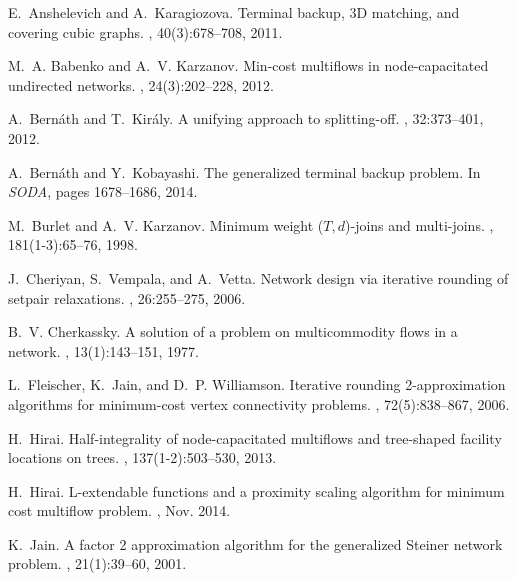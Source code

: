 \documentclass{article}
\begin{document}
\begin{thebibliography}{10}

E.~Anshelevich and A.~Karagiozova.
\newblock Terminal backup, {3D} matching, and covering cubic graphs.
, 40(3):678--708, 2011.

M.~A. Babenko and A.~V. Karzanov.
\newblock Min-cost multiflows in node-capacitated undirected networks.
, 24(3):202--228, 2012.

A.~Bern{\'a}th and T.~Kir{\'a}ly.
\newblock A unifying approach to splitting-off.
, 32:373--401, 2012.

A.~Bern{\'a}th and Y.~Kobayashi.
\newblock The generalized terminal backup problem.
\newblock In {\em {SODA}}, pages 1678--1686, 2014.

M.~Burlet and A.~V. Karzanov.
\newblock Minimum weight {($T, d$)}-joins and multi-joins.
, 181(1-3):65--76, 1998.

J.~Cheriyan, S.~Vempala, and A.~Vetta.
\newblock Network design via iterative rounding of setpair relaxations.
, 26:255--275, 2006.

B.~V. Cherkassky.
\newblock A solution of a problem on multicommodity flows in a network.
, 13(1):143--151, 1977.

L.~Fleischer, K.~Jain, and D.~P. Williamson.
\newblock Iterative rounding 2-approximation algorithms for minimum-cost vertex
  connectivity problems.
, 72(5):838--867, 2006.

H.~Hirai.
\newblock Half-integrality of node-capacitated multiflows and tree-shaped
  facility locations on trees.
, 137(1-2):503--530, 2013.

H.~Hirai.
\newblock L-extendable functions and a proximity scaling algorithm for minimum
  cost multiflow problem.
, Nov. 2014.

K.~Jain.
\newblock A factor 2 approximation algorithm for the generalized {S}teiner
  network problem.
, 21(1):39--60, 2001.


\end{thebibliography}
\end{document}
